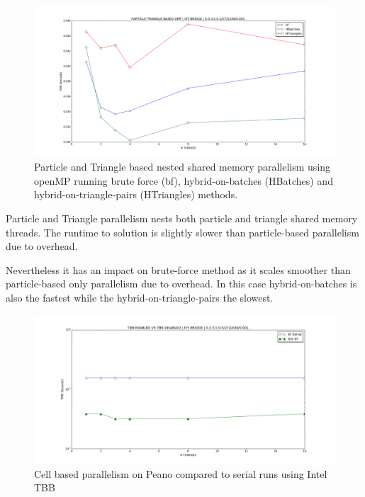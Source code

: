 \begin{figure}[htb]
  \begin{center}
    \includegraphics[width=1\textwidth]{experiments/random/omp/particle_triangle_based_x0.png}
  \end{center}
  \caption{Particle and Triangle based nested shared memory parallelism using openMP running brute force (bf), hybrid-on-batches (HBatches) and hybrid-on-triangle-pairs (HTriangles) methods.}
  \label{figure:particletriangle_omp}
\end{figure}

Particle and Triangle parallelism nests both particle and triangle shared memory threads. The runtime to solution is slightly slower than particle-based parallelism due to overhead. 

Nevertheless it has an impact on brute-force method as it scales smoother than particle-based only parallelism due to overhead. In this case hybrid-on-batches is also the fastest while the hybrid-on-triangle-pairs the slowest. 



\begin{figure}[htb]
  \begin{center}
    \includegraphics[width=1\textwidth]{experiments/random/omp/tbb_vs_serial.png}
  \end{center}
  \caption{Cell based parallelism on Peano compared to serial runs using Intel TBB}
  \label{figure:tbb_vs_serial}
\end{figure}
  


